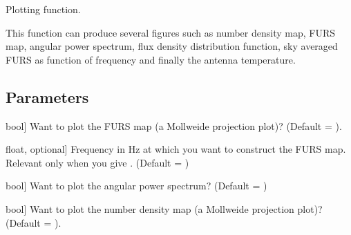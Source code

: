 \documentclass[letterpaper,10pt,english]{sphinxmanual}
\begin{document}
\begin{fulllineitems}
\begin{fulllineitems}
\label{\detokenize{api:furs.furs.visual}}
\pysigstartsignatures
{}
\pysigstopsignatures
\sphinxAtStartPar
Plotting function.

\sphinxAtStartPar
This function can produce several figures such as number density map, FURS map, angular power spectrum,
flux density distribution function, sky averaged FURS as function of frequency and finally the antenna temperature.


\subsection{Parameters}
\label{\detokenize{api:id6}}\begin{description}
\sphinxlineitem{t\_skymap}{[}bool{]}
\sphinxAtStartPar
Want to plot the FURS map (a Mollweide projection plot)? (Default = ).

\sphinxlineitem{nu\_skymap}{[}float, optional{]}
\sphinxAtStartPar
Frequency in Hz at which you want to construct the FURS map. Relevant only when you give .
(Default = )

\sphinxlineitem{aps}{[}bool{]}
\sphinxAtStartPar
Want to plot the angular power spectrum? (Default = )

\sphinxlineitem{n\_skymap}{[}bool{]}
\sphinxAtStartPar
Want to plot the number density map (a Mollweide projection plot)? (Default = ).


\end{description}
\end{fulllineitems}
\end{fulllineitems}
\end{document}
